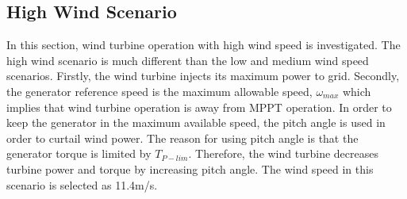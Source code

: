 \subsection{High Wind Scenario}
In this section, wind turbine operation with high wind speed is investigated. The high wind scenario is much different than the low and medium wind speed scenarios. Firstly, the wind turbine injects its maximum power to grid. Secondly, the generator reference speed is the maximum allowable speed, $\omega_{max}$ which implies that wind turbine operation is away from MPPT operation. In order to keep the generator in the maximum available speed, the pitch angle is used in order to curtail wind power. The reason for using pitch angle is that the generator torque is limited by $T_{P-lim}$. Therefore, the wind turbine decreases turbine power and torque by increasing pitch angle. The wind speed in this scenario is selected as 11.4m/s.\par
